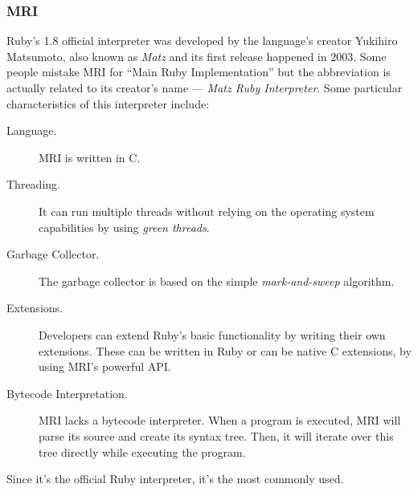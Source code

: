 \subsubsection{MRI}
Ruby's 1.8 official interpreter was developed by the language's creator Yukihiro Matsumoto, also known as \emph{Matz} and its first release happened in 2003. Some people mistake MRI for ``Main Ruby Implementation'' but the abbreviation is actually related to its creator's name --- \emph{Matz Ruby Interpreter}. Some particular characteristics of this interpreter include:
\begin{description}
\item[Language.] MRI is written in C.
\item[Threading.] It can run multiple threads without relying on the operating system capabilities by using \textit{green threads}.
\item[Garbage Collector.] The garbage collector is based on the simple \textit{mark-and-sweep} algorithm.
\item[Extensions.]  Developers can extend Ruby's basic functionality by writing their own extensions. These can be written in Ruby or can be native C extensions, by using MRI's powerful API.
\item[Bytecode Interpretation.] MRI lacks a bytecode interpreter. When a program is executed, MRI will parse its source and create its syntax tree. Then, it will iterate over this tree directly while executing the program.
\end{description}
Since it's the official Ruby interpreter, it's the most commonly used. 


